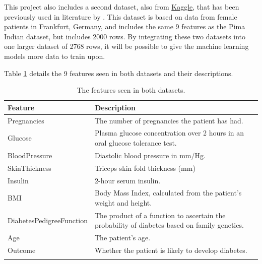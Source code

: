 \documentclass[12pt]{report}
\newcommand{\para}{\vspace{8pt}\noindent}
\begin{document}
\para
This project also includes a second dataset, also from \href{https://www.kaggle.com/datasets/johndasilva/diabetes/data}{Kaggle}, that has been previously used in literature by 
\textcite{zou_construction_2024}. This dataset \autocite{john_dasilva_frankfurt_nodate} is based on data from female patients in Frankfurt, Germany, and includes the same 9 features as the Pima Indian dataset, but includes 2000 rows. By integrating these two datasets into one larger
dataset of 2768 rows, it will be possible to give the machine learning models more data to train upon.

\para Table \ref{tab:Features} details the 9 features seen in both datasets and their descriptions.

\begin{longtable}{ | p{} | p{} | }
    \hline
    \cellcolor{blue!25}Feature & \cellcolor{blue!25}Description \\
    \hline
    Pregnancies & The number of pregnancies the patient has had. \\
    \hline
    Glucose & Plasma glucose concentration over 2 hours in an oral glucose tolerance test. \\
    \hline
    BloodPressure & Diastolic blood pressure in mm/Hg. \\
    \hline
    SkinThickness & Triceps skin fold thickness (mm) \\
    \hline
    Insulin & 2-hour serum insulin. \\
    \hline
    BMI & Body Mass Index, calculated from the patient's weight and height. \\
    \hline
    DiabetesPedigreeFunction & The product of a function to ascertain the probability of diabetes based on family genetics. \autocite{akmese_diagnosing_2022} \\
    \hline
    Age & The patient's age.\\
    \hline
    Outcome & Whether the patient is likely to develop diabetes.\\
    \hline 
    \caption{The features seen in both datasets.}\label{tab:Features}
\end{longtable}

\end{document}
